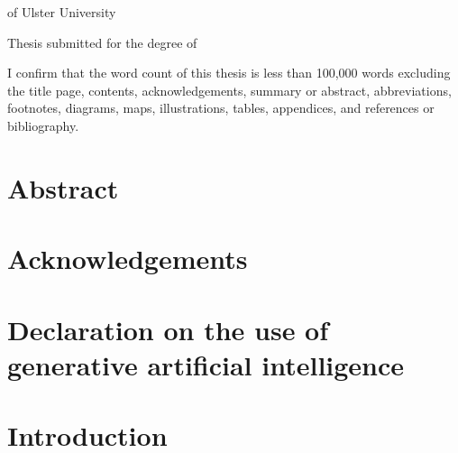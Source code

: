\documentclass[12pt,a4paper,oneside]{report}
\begin{document}
\begin{titlepage}
\centering\onehalfspacing
{\Large\bfseries \ThesisTitle\par}
\vspace{2cm}
{\large \ThesisAuthor\par}
\vspace{1.5cm}
\if\relax\detokenize\expandafter{\ThesisSchool}\relax\else\ThesisSchool\par\fi
\ThesisFaculty{} of Ulster University\par
\vspace{1cm}
Thesis submitted for the degree of \ThesisDegree\par
\vspace{1cm}
\SubmissionMonthYear\par
\vfill
I confirm that the word count of this thesis is less than 100,000 words excluding the title page, contents,
acknowledgements, summary or abstract, abbreviations, footnotes, diagrams, maps, illustrations, tables, appendices,
and references or bibliography.\par
\end{titlepage}

\chapter*{Abstract}

\tableofcontents
\listoffigures
\listoftables
\printglossary[type=\acronymtype,title=Abbreviations]
\chapter*{Acknowledgements}

\chapter*{Declaration on the use of generative artificial intelligence}\label{ch:ai-declaration}

\clearpage
{}

\chapter{Introduction}\label{ch:introduction}

\end{document}
